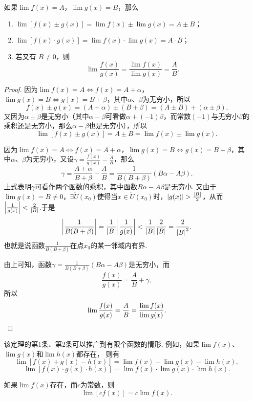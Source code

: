 \begin{theorem}\label{theorem:极限.极限的四则运算法则}
如果\(\lim f(x)=A\)，\(\lim g(x)=B\)，那么\begin{enumerate}
\item \(\lim [f(x) \pm g(x)] = \lim f(x) \pm \lim g(x) = A \pm B\)；
\item \(\lim [f(x) \cdot g(x)] = \lim f(x) \cdot \lim g(x) = A \cdot B\)；
\item 若又有 \(B \neq 0\)，则
\[\lim \frac{f(x)}{g(x)} = \frac{\lim f(x)}{\lim g(x)} = \frac{A}{B}.\]
\end{enumerate}
\begin{proof}
因为\(\lim f(x)=A \iff f(x)=A+\alpha\)，\(\lim g(x)=B \iff g(x)=B+\beta\)，其中\(\alpha\)、\(\beta\)为无穷小，所以\[
f(x) \pm g(x) = (A+\alpha)\pm(B+\beta) = (A \pm B) + (\alpha \pm \beta).
\]又因为\(\alpha\pm\beta\)是无穷小（其中\(\alpha-\beta\)可看做\(\alpha+(-1)\beta\)，而常数\((-1)\)与无穷小\(\beta\)的乘积还是无穷小，那么\(\alpha-\beta\)也是无穷小），所以\[
\lim [f(x) \pm g(x)] = A \pm B = \lim f(x) \pm \lim g(x).
\]

因为\(\lim f(x)=A \iff f(x)=A+\alpha\)，\(\lim g(x)=B \iff g(x)=B+\beta\)，其中\(\alpha\)、\(\beta\)为无穷小，又设\(\gamma = \frac{f(x)}{g(x)} - \frac{A}{B}\)，那么\[
\gamma = \frac{A+\alpha}{B+\beta} - \frac{A}{B}
= \frac{1}{B(B+\beta)} (B \alpha - A \beta).
\]上式表明\(\gamma\)可看作两个函数的乘积，其中函数\(B \alpha - A \beta\)是无穷小.
又由于\(\lim g(x) = B \neq 0\)，\(\exists \mathring{U}(x_0)\)使得当\(x\in\mathring{U}(x_0)\)时，\(\abs{g(x)}>\frac{\abs{B}}{2}\)，从而\(\abs{\frac{1}{g(x)}}<\frac{2}{\abs{B}}\).于是\[
\abs{\frac{1}{B(B+\beta)}}
=\frac{1}{\abs{B}} \abs{\frac{1}{g(x)}}
<\frac{1}{\abs{B}} \frac{2}{\abs{B}}
=\frac{2}{\abs{B}^2}.
\]也就是说函数\(\frac{1}{B(B+\beta)}\)在点\(x_0\)的某一邻域内有界.

由上可知，函数\(\gamma = \frac{1}{B(B+\beta)} (B \alpha - A \beta)\)是无穷小，而\[
\frac{f(x)}{g(x)} = \frac{A}{B} + \gamma,
\]所以\[
\lim\frac{f(x)}{g(x)} = \frac{A}{B} = \frac{\lim f(x)}{\lim g(x)}.
\qedhere
\]
\end{proof}
\end{theorem}

该定理的第1条、第2条可以推广到有限个函数的情形.
例如，如果\(\lim f(x)\)、\(\lim g(x)\)和\(\lim h(x)\)都存在，
则有\[
	\lim[f(x) + g(x) - h(x)] = \lim f(x) + \lim g(x) - \lim h(x),
\]\[
	\lim[f(x) \cdot g(x) \cdot h(x)] = \lim f(x) \cdot \lim g(x) \cdot \lim h(x).
\]

\begin{corollary}
如果\(\lim f(x)\)存在，而\(c\)为常数，则\[\lim [c f(x)] = c \lim f(x).\]
\end{corollary}

